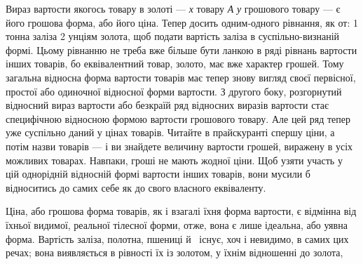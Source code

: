 Вираз вартости якогось товару в золоті — \emph{х} товару \emph{А} \deq{} \emph{у}
грошового товару — є його грошова форма, або його ціна. Тепер
досить одним-одного рівнання, як от: 1 тонна заліза \deq{} 2 унціям
золота, щоб подати вартість заліза в суспільно-визнаній формі.
Цьому рівнанню не треба вже більше бути ланкою в ряді рівнань
вартости інших товарів, бо еквівалентний товар, золото, має
вже характер грошей. Тому загальна відносна форма вартости
товарів має тепер знову вигляд своєї первісної, простої або одиночної
відносної форми вартости. З другого боку, розгорнутий
відносний вираз вартости або безкраїй ряд відносних виразів
вартости стає специфічною відносною формою вартости грошового
товару. Але цей ряд тепер уже суспільно даний у цінах
товарів. Читайте в прайскуранті спершу ціни, а потім назви
товарів — і ви знайдете величину вартости грошей, виражену
в усіх можливих товарах. Навпаки, гроші не мають жодної
ціни. Щоб узяти участь у цій однорідній відносній формі вартости
інших товарів, вони мусили б відноситись до самих себе як до
свого власного еквіваленту.

\disablefootnotebreak{}
Ціна, або грошова форма товарів, як і взагалі їхня форма вартости,
є відмінна від їхньої видимої, реальної тілесної форми, отже,
вона є лише ідеальна, або уявна форма. Вартість заліза, полотна,
пшениці й~ існує, хоч і невидимо, в самих цих речах; вона
виявляється в рівності їх із золотом, у їхнім відношенні до золота,
\parbreak{}  %
